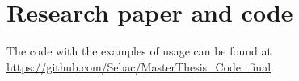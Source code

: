 
\chapter{Research paper and code} %

\label{AppendixA} %

The code with the examples of usage can be found at \url{https://github.com/Sebac/MasterThesis_Code_final}.


